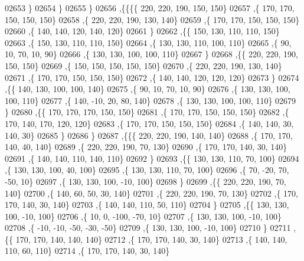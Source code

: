 \begin{DoxyCode}
02653     \}
02654    \}
02655   \}
02656  ,\{\{\{\{   220,   220,   190,   150,   150\}
02657     ,\{   170,   170,   150,   150,   150\}
02658     ,\{   220,   220,   190,   130,   140\}
02659     ,\{   170,   170,   150,   150,   150\}
02660     ,\{   140,   140,   120,   140,   120\}
02661     \}
02662    ,\{\{   150,   130,   110,   110,   150\}
02663     ,\{   150,   130,   110,   110,   150\}
02664     ,\{   130,   130,   110,   100,   110\}
02665     ,\{    90,    10,    70,    10,    90\}
02666     ,\{   130,   130,   100,   100,   110\}
02667     \}
02668    ,\{\{   220,   220,   190,   150,   150\}
02669     ,\{   150,   150,   150,   150,   150\}
02670     ,\{   220,   220,   190,   130,   140\}
02671     ,\{   170,   170,   150,   150,   150\}
02672     ,\{   140,   140,   120,   120,   120\}
02673     \}
02674    ,\{\{   140,   130,   100,   100,   140\}
02675     ,\{    90,    10,    70,    10,    90\}
02676     ,\{   130,   130,   100,   100,   110\}
02677     ,\{   140,   -10,    20,    80,   140\}
02678     ,\{   130,   130,   100,   100,   110\}
02679     \}
02680    ,\{\{   170,   170,   170,   150,   150\}
02681     ,\{   170,   170,   150,   150,   150\}
02682     ,\{   170,   140,   170,   120,   120\}
02683     ,\{   170,   170,   150,   150,   150\}
02684     ,\{   140,   140,    30,   140,    30\}
02685     \}
02686    \}
02687   ,\{\{\{   220,   220,   190,   140,   140\}
02688     ,\{   170,   170,   140,    40,   140\}
02689     ,\{   220,   220,   190,    70,   130\}
02690     ,\{   170,   170,   140,    30,   140\}
02691     ,\{   140,   140,   110,   140,   110\}
02692     \}
02693    ,\{\{   130,   130,   110,    70,   100\}
02694     ,\{   130,   130,   100,    40,   100\}
02695     ,\{   130,   130,   110,    70,   100\}
02696     ,\{    70,   -20,    70,   -50,    10\}
02697     ,\{   130,   130,   100,   -10,   100\}
02698     \}
02699    ,\{\{   220,   220,   190,    70,   140\}
02700     ,\{   140,    60,    50,    30,   140\}
02701     ,\{   220,   220,   190,    70,   130\}
02702     ,\{   170,   170,   140,    30,   140\}
02703     ,\{   140,   140,   110,    50,   110\}
02704     \}
02705    ,\{\{   130,   130,   100,   -10,   100\}
02706     ,\{    10,     0,  -100,   -70,    10\}
02707     ,\{   130,   130,   100,   -10,   100\}
02708     ,\{   -10,   -10,   -50,   -30,   -50\}
02709     ,\{   130,   130,   100,   -10,   100\}
02710     \}
02711    ,\{\{   170,   170,   140,   140,   140\}
02712     ,\{   170,   170,   140,    30,   140\}
02713     ,\{   140,   140,   110,    60,   110\}
02714     ,\{   170,   170,   140,    30,   140\}

\end{DoxyCode}
